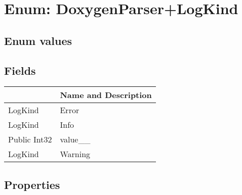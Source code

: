 \documentclass[11pt, oneside, a4paper]{book}
\begin{document}
\section{Enum: DoxygenParser+LogKind}

\subsection{Enum values}

\subsection{Fields}
\begin{center}
\begin{tabular}{| p{3cm} | p{12cm} | }
\hline
\textbf{ } & \textbf{ Name and Description}\\
\hline
 LogKind &  Error\hypertarget{SoftwareEngineeringTools.{}Documentation.{}DoxygenParser+LogKind.{}Error}{}\\
\hline
 LogKind &  Info\hypertarget{SoftwareEngineeringTools.{}Documentation.{}DoxygenParser+LogKind.{}Info}{}\\
\hline
 Public  Int32 &  value\_\_\hypertarget{SoftwareEngineeringTools.{}Documentation.{}DoxygenParser+LogKind.{}value\_\_}{}\\
\hline
 LogKind &  Warning\hypertarget{SoftwareEngineeringTools.{}Documentation.{}DoxygenParser+LogKind.{}Warning}{}\\
\hline
\end{tabular}
\end{center}

\subsection{Properties}
\end{document}
